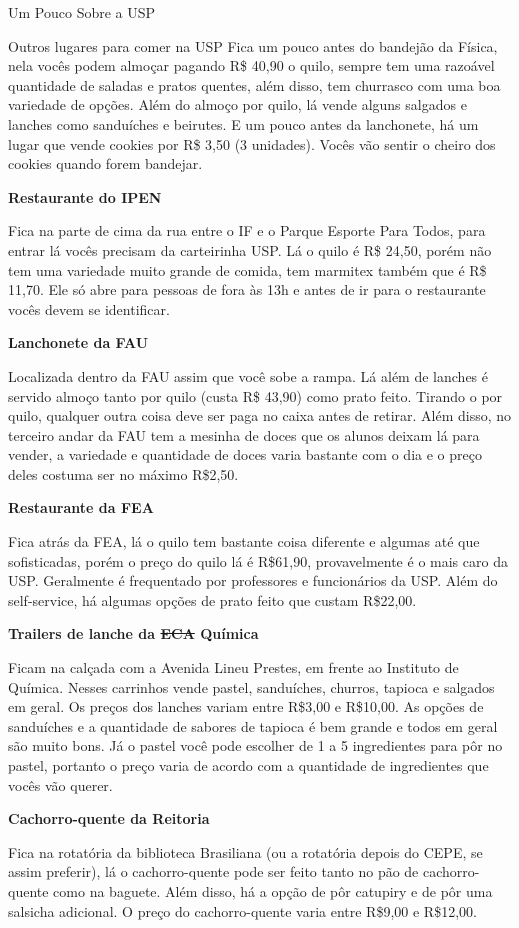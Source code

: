 \begin{secao}{Um Pouco Sobre a USP}
\begin{subsecao}{Outros lugares para comer na USP}
Fica um pouco antes do bandejão da Física, nela vocês podem almoçar pagando R\$
40,90 o quilo, sempre tem uma razoável quantidade de saladas e pratos
quentes, além disso, tem churrasco com uma boa variedade de opções.
Além do almoço por quilo, lá vende alguns salgados e lanches como sanduíches e
beirutes. E um pouco antes da lanchonete, há um lugar que vende cookies por R\$
3,50 (3 unidades). Vocês vão sentir o cheiro dos cookies quando forem bandejar.

{\bf Restaurante do IPEN}

Fica na parte de cima da rua entre o IF e o Parque Esporte Para Todos, para
entrar lá vocês precisam da carteirinha USP. Lá o quilo é R\$ 24,50, porém não
tem uma variedade muito grande de comida, tem marmitex também que é R\$ 11,70.
Ele só abre para pessoas de fora às 13h e antes de ir para o restaurante vocês
devem se identificar.

{\bf Lanchonete da FAU}

Localizada dentro da FAU assim que você sobe a rampa. Lá além de lanches é
servido almoço tanto por quilo (custa R\$ 43,90) como prato feito. Tirando o por
quilo, qualquer outra coisa deve ser paga no caixa antes de retirar. Além
disso, no terceiro andar da FAU tem a mesinha de doces que os alunos deixam lá
para vender, a variedade e quantidade de doces varia bastante com o dia e o
preço deles costuma ser no máximo R\$2,50.

{\bf Restaurante da FEA}

Fica atrás da FEA, lá o quilo tem bastante coisa diferente e algumas até que
sofisticadas, porém o preço do quilo lá é R\$61,90, provavelmente é o mais caro
da USP. Geralmente é frequentado por professores e funcionários da USP. Além do
self-service, há algumas opções de prato feito que custam R\$22,00.
\pagebreak

{\bf Trailers de lanche da \sout{ECA} Química}

Ficam na calçada com a Avenida Lineu Prestes, em frente ao Instituto de
Química. Nesses carrinhos vende pastel, sanduíches, churros, tapioca e salgados
em geral. Os preços dos lanches variam entre R\$3,00 e R\$10,00. As opções de
sanduíches e a quantidade de sabores de tapioca é bem grande e todos em geral
são muito bons. Já o pastel você pode escolher de 1 a 5 ingredientes para pôr
no pastel, portanto o preço varia de acordo com a quantidade de ingredientes que
vocês vão querer.

{\bf Cachorro-quente da Reitoria}

Fica na rotatória da biblioteca Brasiliana (ou a rotatória depois do CEPE, se assim preferir),
lá o cachorro-quente pode ser feito tanto no pão de cachorro-quente como na baguete. Além disso,
há a opção de pôr catupiry e de pôr uma salsicha adicional. O preço do cachorro-quente varia
entre R\$9,00 e R\$12,00.


\end{subsecao}
\end{secao}
